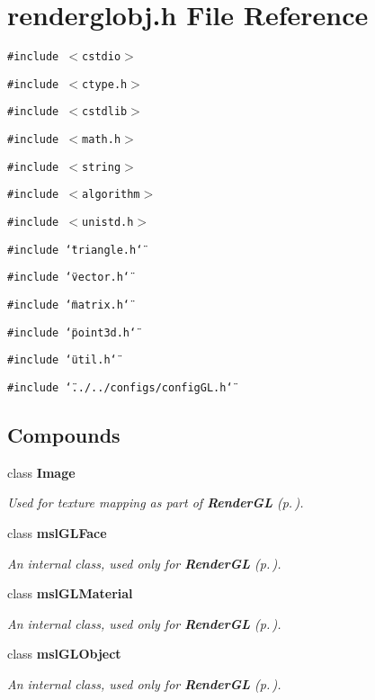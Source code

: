 \section{renderglobj.h File Reference}
\label{renderglobj_8h}
{\tt \#include $<$cstdio$>$}\par
{\tt \#include $<$ctype.h$>$}\par
{\tt \#include $<$cstdlib$>$}\par
{\tt \#include $<$math.h$>$}\par
{\tt \#include $<$string$>$}\par
{\tt \#include $<$algorithm$>$}\par
{\tt \#include $<$unistd.h$>$}\par
{\tt \#include \char`\"{}triangle.h\char`\"{}}\par
{\tt \#include \char`\"{}vector.h\char`\"{}}\par
{\tt \#include \char`\"{}matrix.h\char`\"{}}\par
{\tt \#include \char`\"{}point3d.h\char`\"{}}\par
{\tt \#include \char`\"{}util.h\char`\"{}}\par
{\tt \#include \char`\"{}../../configs/config\-GL.h\char`\"{}}\par
\subsection*{Compounds}
\begin{CompactItemize}
\item 
class {\bf Image}
\begin{CompactList}\small\item\em Used for texture mapping as part of {\bf Render\-GL} {\rm (p.\,\pageref{classRenderGL})}.\item\end{CompactList}\item 
class {\bf msl\-GLFace}
\begin{CompactList}\small\item\em An internal class, used only for {\bf Render\-GL} {\rm (p.\,\pageref{classRenderGL})}.\item\end{CompactList}\item 
class {\bf msl\-GLMaterial}
\begin{CompactList}\small\item\em An internal class, used only for {\bf Render\-GL} {\rm (p.\,\pageref{classRenderGL})}.\item\end{CompactList}\item 
class {\bf msl\-GLObject}
\begin{CompactList}\small\item\em An internal class, used only for {\bf Render\-GL} {\rm (p.\,\pageref{classRenderGL})}.\item\end{CompactList}\end{CompactItemize}
